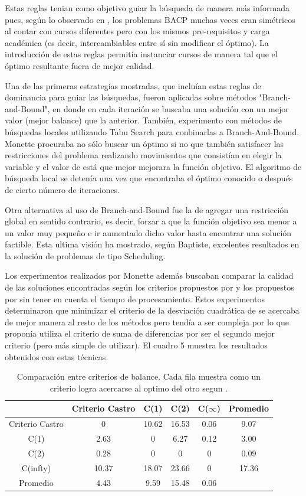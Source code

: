 \documentclass[letter, 10pt]{article}
\begin{document}
Estas reglas tenian como objetivo guiar la búsqueda de manera más
informada pues, según lo observado en \cite{monette2007cp}, los
problemas BACP muchas veces eran simétricos al contar con cursos
diferentes pero con los mismos pre-requisitos y carga académica (es
decir, intercambiables entre sí sin modificar el óptimo). La
introducción de estas reglas permitía instanciar cursos de manera tal
que el óptimo resultante fuera de mejor calidad.

Una de las primeras estrategias mostradas, que incluían estas reglas de
dominancia para guiar las búsquedas, fueron aplicadas sobre métodos
"Branch-and-Bound", en donde en cada iteración se buscaba una solución
con un mejor valor (mejor balance) que la anterior. También, experimento
con métodos de búsquedas locales utilizando Tabu Search para conbinarlas
a Branch-And-Bound. Monette procuraba no sólo buscar un óptimo si no que
también satisfacer las restricciones del problema realizando movimientos
que consistían en elegir la variable y el valor de está que mejor
mejorara la función objetivo. El algoritmo de búsqueda local se detenía
una vez que encontraba el óptimo conocido o después de cierto número de
iteraciones.

Otra alternativa al uso de Branch-and-Bound fue la de agregar una
restricción global en sentido contrario, es decir, forzar a que la
función objetivo sea menor a un valor muy pequeño e ir aumentado dicho
valor hasta encontrar una solución factible. Esta ultima visión ha
mostrado, según Baptiste\cite{baptiste2001constraint}, excelentes
resultados en la solución de problemas de tipo Scheduling.

Los experimentos realizados por Monette además buscaban comparar la
calidad de las soluciones encontradas según los criterios propuestos por
\cite{castro2001variable} y los propuestos por
\cite{schaus2007deviation} sin tener en cuenta el tiempo de
procesamiento. Estos experimentos determinaron que minimizar el criterio
de la desviación cuadrática de \cite{schaus2007deviation} se acercaba de
mejor manera al resto de los métodos pero tendía a ser compleja por lo
que proponía utiliza el criterio de suma de diferencias por ser el
segundo mejor criterio (pero más simple de utilizar). El cuadro 5 muestra los resultados obtenidos con estas técnicas.


\begin{table}[h]
\centering


\begin{tabular}{|c|c|c|c|c|c|}
\hline 
 & Criterio Castro & C(1) & C(2) & C($\infty$) & Promedio\tabularnewline
\hline 
\hline 
Criterio Castro & 0 & 10.62 & 16.53 & 0.06 & 9.07\tabularnewline
\hline 
C(1) & 2.63 & 0 & 6.27 & 0.12 & 3.00\tabularnewline
\hline 
C(2) & 0.28 & 0 & 0 & 0 & 0.09\tabularnewline
\hline 
C(infty) & 10.37 & 18.07 & 23.66 & 0 & 17.36\tabularnewline
\hline 
Promedio & 4.43 & 9.59 & 15.48 & 0.06 & \tabularnewline
\hline 
\end{tabular}
\caption{Comparación entre criterios de balance. Cada fila muestra como un
criterio logra acercarse al optimo del otro segun \cite{monette2007cp}.}
\end{table}
\end{document}
